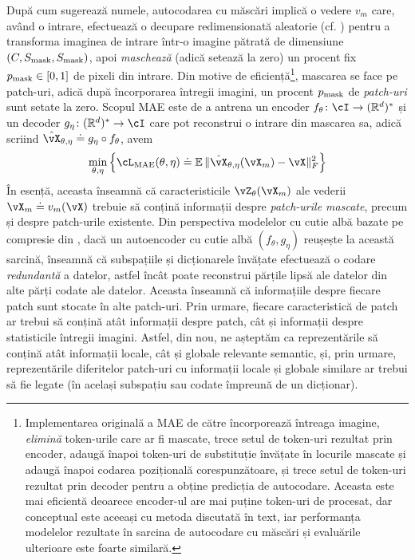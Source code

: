 \documentclass[../../book-main_ro.tex]{subfiles}
\begin{document}
După cum sugerează numele, autocodarea cu măscări implică o vedere \(v_{m}\) care, având o intrare, efectuează o decupare redimensionată aleatorie (cf. ) pentru a transforma imaginea de intrare într-o imagine pătrată de dimensiune \((C, S_{\mathrm{mask}}, S_{\mathrm{mask}})\), apoi \textit{maschează} (adică setează la zero) un procent fix \(p_{\mathrm{mask}} \in [0, 1]\) de pixeli din intrare. Din motive de eficiență\footnote{Implementarea originală a MAE de către \cite{he2022masked} încorporează întreaga imagine, \textit{elimină} token-urile care ar fi mascate, trece setul de token-uri rezultat prin encoder, adaugă înapoi token-uri de substituție învățate în locurile mascate și adaugă înapoi codarea pozițională corespunzătoare, și trece setul de token-uri rezultat prin decoder pentru a obține predicția de autocodare. Aceasta este mai eficientă deoarece encoder-ul are mai puține token-uri de procesat, dar conceptual este aceeași cu metoda discutată în text, iar performanța modelelor rezultate în sarcina de autocodare cu măscări și evaluările ulterioare este foarte similară.}, mascarea se face pe patch-uri, adică după încorporarea întregii imagini, un procent \(p_{\mathrm{mask}}\) de \textit{patch-uri} sunt setate la zero. Scopul MAE este de a antrena un encoder \(f_{\theta} \colon \cI \to (\R^{d})^{*}\) și un decoder \(g_{\eta} \colon (\R^{d})^{*} \to \cI\) care pot reconstrui o intrare din mascarea sa, adică scriind \(\hat{\vX}_{\theta, \eta} \doteq g_{\eta} \circ f_{\theta}\), avem
\begin{equation}
    \min_{\theta, \eta}\bc{\cL_{\mathrm{MAE}}(\theta, \eta) \doteq \Ex\norm{\hat{\vX}_{\theta, \eta}(\vX_{m}) - \vX}_{F}^{2}}
\end{equation}
În esență, aceasta înseamnă că caracteristicile \(\vZ_{\theta}(\vX_{m})\) ale vederii \(\vX_{m} \doteq v_{m}(\vX)\) trebuie să conțină informații despre \textit{patch-urile mascate}, precum și despre patch-urile existente. Din perspectiva modelelor cu cutie albă bazate pe compresie din , dacă un autoencoder cu cutie albă \((f_{\theta}, g_{\eta})\) reușește la această sarcină, înseamnă că subspațiile și dicționarele învățate efectuează o codare \textit{redundantă} a datelor, astfel încât poate reconstrui părțile lipsă ale datelor din alte părți codate ale datelor. Aceasta înseamnă că informațiile despre fiecare patch sunt stocate în alte patch-uri. Prin urmare, fiecare caracteristică de patch ar trebui să conțină atât informații despre patch, cât și informații despre statisticile întregii imagini. Astfel, din nou, ne așteptăm ca reprezentările să conțină atât informații locale, cât și globale relevante semantic, și, prin urmare, reprezentările diferitelor patch-uri cu informații locale și globale similare ar trebui să fie legate (în același subspațiu sau codate împreună de un dicționar).
\end{document}
